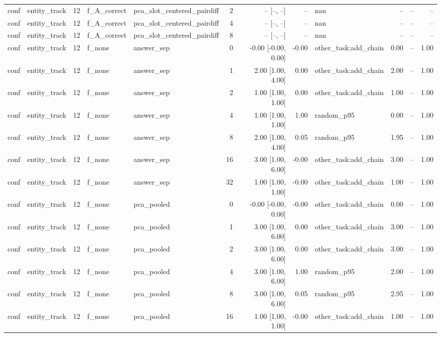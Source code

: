 \begin{tabular}{llrllrrrlrrr}
conf & entity\_track & 12 & f\_A\_correct & pca\_slot\_centered\_pairdiff & 2 & -- [--, --] & -- & nan & -- & -- & -- \\
conf & entity\_track & 12 & f\_A\_correct & pca\_slot\_centered\_pairdiff & 4 & -- [--, --] & -- & nan & -- & -- & -- \\
conf & entity\_track & 12 & f\_A\_correct & pca\_slot\_centered\_pairdiff & 8 & -- [--, --] & -- & nan & -- & -- & -- \\
conf & entity\_track & 12 & f\_none & answer\_sep & 0 & -0.00 [-0.00, 0.00] & -0.00 & other\_task:add\_chain & 0.00 & -- & 1.00 \\
conf & entity\_track & 12 & f\_none & answer\_sep & 1 & 2.00 [1.00, 4.00] & 0.00 & other\_task:add\_chain & 2.00 & -- & 1.00 \\
conf & entity\_track & 12 & f\_none & answer\_sep & 2 & 1.00 [1.00, 1.00] & 0.00 & other\_task:add\_chain & 1.00 & -- & 1.00 \\
conf & entity\_track & 12 & f\_none & answer\_sep & 4 & 1.00 [1.00, 1.00] & 1.00 & random\_p95 & 0.00 & -- & 1.00 \\
conf & entity\_track & 12 & f\_none & answer\_sep & 8 & 2.00 [1.00, 4.00] & 0.05 & random\_p95 & 1.95 & -- & 1.00 \\
conf & entity\_track & 12 & f\_none & answer\_sep & 16 & 3.00 [1.00, 6.00] & -0.00 & other\_task:add\_chain & 3.00 & -- & 1.00 \\
conf & entity\_track & 12 & f\_none & answer\_sep & 32 & 1.00 [1.00, 1.00] & -0.00 & other\_task:add\_chain & 1.00 & -- & 1.00 \\
conf & entity\_track & 12 & f\_none & pca\_pooled & 0 & -0.00 [-0.00, 0.00] & -0.00 & other\_task:add\_chain & 0.00 & -- & 1.00 \\
conf & entity\_track & 12 & f\_none & pca\_pooled & 1 & 3.00 [1.00, 6.00] & 0.00 & other\_task:add\_chain & 3.00 & -- & 1.00 \\
conf & entity\_track & 12 & f\_none & pca\_pooled & 2 & 3.00 [1.00, 6.00] & 0.00 & other\_task:add\_chain & 3.00 & -- & 1.00 \\
conf & entity\_track & 12 & f\_none & pca\_pooled & 4 & 3.00 [1.00, 6.00] & 1.00 & random\_p95 & 2.00 & -- & 1.00 \\
conf & entity\_track & 12 & f\_none & pca\_pooled & 8 & 3.00 [1.00, 6.00] & 0.05 & random\_p95 & 2.95 & -- & 1.00 \\
conf & entity\_track & 12 & f\_none & pca\_pooled & 16 & 1.00 [1.00, 1.00] & -0.00 & other\_task:add\_chain & 1.00 & -- & 1.00 \\

\end{tabular}
